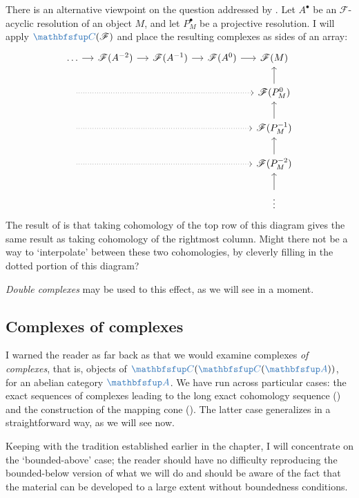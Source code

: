 There is an alternative viewpoint on the question addressed by
. Let $A^\bullet$ be an
$\mathscr{F}$-acyclic resolution of an object $M$, and let
$P_M^\bullet$ be a projective resolution. I will apply
$\categ{C}(\mathscr{F})$ and place the resulting complexes as sides of
an array:
\[\begin{tikzcd}[column sep=small]
    \dots \arrow[r] & \mathscr{F}(A^{-2}) \arrow[r] &
    \mathscr{F}(A^{-1})
    \arrow[r] & \mathscr{F}(A^0) \arrow[r] & \mathscr{F}(M) \\
    {} & & & & \mathscr{F}(P_M^0) \arrow[u] \\
    {} & & & & \mathscr{F}(P_M^{-1}) \arrow[u] \\
    {} & & & & \mathscr{F}(P_M^{-2}) \arrow[u] \\
    & & & & \vdots \arrow[u] \arrow[dotted, from=2-1, to=2-5]
    \arrow[dotted, from=3-1, to=3-5] \arrow[dotted, from=4-1, to=4-5]
  \end{tikzcd}\] The result of  is that
taking cohomology of the top row of this diagram gives the same result
as taking cohomology of the rightmost column. Might there not be a way
to `interpolate' between these two cohomologies, by cleverly filling
in the dotted portion of this diagram?

\emph{Double complexes} may be used to this effect, as we will see in
a moment.

\subsection{Complexes of complexes}
\label{subsec:homol:complexes-of-complexes}

I warned the reader as far back as
 that we would examine
complexes \emph{of complexes}, that is, objects of
$\categ{C}(\categ{C}(\categ{A}))$, for an abelian category
$\categ{A}$. We have run across particular cases: the exact sequences
of complexes leading to the long exact cohomology sequence
() and the
construction of the mapping cone
(). The latter
case generalizes in a straightforward way, as we will see now.

Keeping with the tradition established earlier in the chapter, I will
concentrate on the `bounded-above' case; the reader should have no
difficulty reproducing the bounded-below version of what we will do
and should be aware of the fact that the material can be developed to
a large extent without boundedness conditions.

